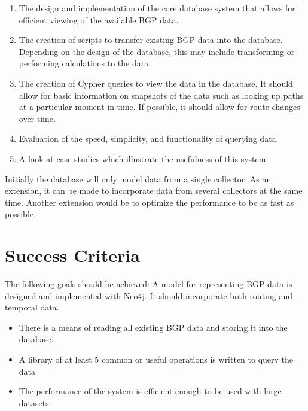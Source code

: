 \documentclass[12pt,a4paper,twoside]{article}
\begin{document}
\begin{enumerate}

\item The design and implementation of the core database system that allows for efficient viewing of the available BGP data.

\item The creation of scripts to transfer existing BGP data into the database. Depending on the design of the database, this may include transforming or performing calculations to the data. 

\item The creation of Cypher queries to view the data in the database. It should allow for basic information on snapshots of the data such as looking up paths at a particular moment in time. If possible, it should allow for route changes over time.

\item Evaluation of the speed, simplicity, and functionality of querying data.

\item A look at case studies which illustrate the usefulness of this system.

\end{enumerate}

Initially the database will only model data from a single collector. As an extension, it can be made to incorporate data from several collectors at the same time. Another extension would be to optimize the performance to be as fast as possible.  

\section*{Success Criteria}
The following goals should be achieved: 
A model for representing BGP data is designed and implemented with Neo4j. It should incorporate both routing and temporal data.

\begin{itemize}

\item There is a means of reading all existing BGP data and storing it into the database.

\item A library of at least 5 common or useful operations is written to query the data

\item The performance of the system is efficient enough to be used with large datasets.

\end{itemize}
\end{document}
